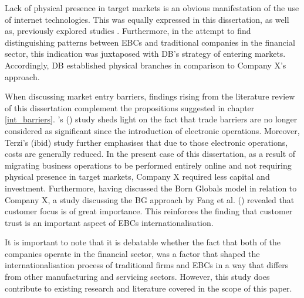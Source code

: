 \documentclass[11pt,a4paper]{article}
\begin{document}
{{{Lack of physical presence in target markets is an obvious manifestation of the use of internet technologies. This was equally expressed in this dissertation, as well as, previously explored studies \parencite{loaneCrossnationalComparisonInternationalisation2002}. Furthermore, in the attempt to find distinguishing patterns between EBCs and traditional companies in the financial sector, this indication was juxtaposed with DB's strategy of entering markets. Accordingly, DB established physical branches in comparison to Company X's approach. \par
When discussing market entry barriers, findings rising from the literature review of this dissertation complement the propositions suggested in chapter \ref{int_barriers}. \citeauthor{terziImpactEcommerceInternational2011}'s (\citeyear{terziImpactEcommerceInternational2011}) study sheds light on the fact that trade barriers are no longer considered as significant since the introduction of electronic operations. Moreover, Terzi's (ibid) study further emphasises that due to those electronic operations, costs are generally reduced. In the present case of this dissertation, as a result of migrating business operations to be performed entirely online and not requiring physical presence in target markets, Company X required less capital and investment. Furthermore, having discussed the Born Globals model 
in relation to Company X, a study discussing the BG approach by Fang et al. (\citeyear{fangParachutingInternationalizationStudy2017}) revealed that customer focus is of great importance. This reinforces the finding that customer trust is an important aspect of EBCs internationalisation. \par
It is important to note that it is debatable whether the fact that both of the companies operate in the financial sector, was a factor that shaped the internationalisation process of traditional firms and EBCs in a way that differs from other manufacturing and servicing sectors. However, this study does contribute to existing research and literature covered in the scope of this paper.

\newpage
}}}
\end{document}
